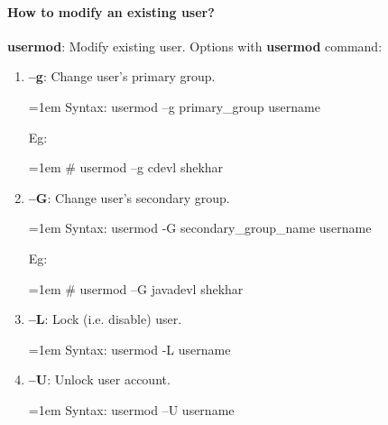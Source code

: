 \begin{flushleft}
	
	\newpage
	
	\paragraph{How to modify an existing user?}
	\bigskip
	\textbf{usermod}: Modify existing user.
	\newline
	Options with \textbf{usermod} command:
	\begin{enumerate}[label=(\alph*)]
		\item \textbf{–g}: Change user's primary group.
		\bigskip
		\begin{tcolorbox}[breakable,notitle,boxrule=0pt,colback=pink,colframe=pink]
			\color{black}
			\font=1em
			Syntax: usermod –g primary\_group username
			\font=4pt
		\end{tcolorbox}
		Eg:
		\bigskip
		\begin{tcolorbox}[breakable,notitle,boxrule=-0pt,colback=black,colframe=black]
			\color{green}
			\font=1em
			\# usermod –g cdevl shekhar
			\font=4pt
		\end{tcolorbox}
		
		\item \textbf{–G}: Change user's secondary group.
		\bigskip
		\begin{tcolorbox}[breakable,notitle,boxrule=0pt,colback=pink,colframe=pink]
			\color{black}
			\font=1em
			Syntax: usermod -G secondary\_group\_name username
			\font=4pt
		\end{tcolorbox}
		Eg:
		\bigskip
		\begin{tcolorbox}[breakable,notitle,boxrule=-0pt,colback=black,colframe=black]
			\color{green}
			\font=1em
			\# usermod –G javadevl shekhar
			\font=4pt
		\end{tcolorbox}
		
		
		\item \textbf{–L}: Lock (i.e. disable) user.
		\bigskip
		\begin{tcolorbox}[breakable,notitle,boxrule=0pt,colback=pink,colframe=pink]
			\color{black}
			\font=1em
			Syntax: usermod -L username
			\font=4pt
		\end{tcolorbox}		
		
		\item \textbf{–U}: Unlock user account.
		\bigskip
		\begin{tcolorbox}[breakable,notitle,boxrule=0pt,colback=pink,colframe=pink]
			\color{black}
			\font=1em
			Syntax: usermod –U username
			\font=4pt
		\end{tcolorbox}
		

\end{enumerate}
\end{flushleft}
